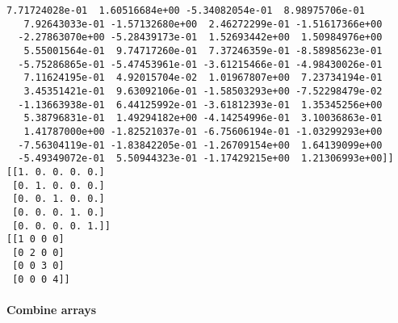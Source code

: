 \documentclass[11pt]{article}
\begin{document}
\begin{Verbatim}[commandchars=\\\{\}]
   7.71724028e-01  1.60516684e+00 -5.34082054e-01  8.98975706e-01
   7.92643033e-01 -1.57132680e+00  2.46272299e-01 -1.51617366e+00
  -2.27863070e+00 -5.28439173e-01  1.52693442e+00  1.50984976e+00
   5.55001564e-01  9.74717260e-01  7.37246359e-01 -8.58985623e-01
  -5.75286865e-01 -5.47453961e-01 -3.61215466e-01 -4.98430026e-01
   7.11624195e-01  4.92015704e-02  1.01967807e+00  7.23734194e-01
   3.45351421e-01  9.63092106e-01 -1.58503293e+00 -7.52298479e-02
  -1.13663938e-01  6.44125992e-01 -3.61812393e-01  1.35345256e+00
   5.38796831e-01  1.49294182e+00 -4.14254996e-01  3.10036863e-01
   1.41787000e+00 -1.82521037e-01 -6.75606194e-01 -1.03299293e+00
  -7.56304119e-01 -1.83842205e-01 -1.26709154e+00  1.64139099e+00
  -5.49349072e-01  5.50944323e-01 -1.17429215e+00  1.21306993e+00]]
[[1. 0. 0. 0. 0.]
 [0. 1. 0. 0. 0.]
 [0. 0. 1. 0. 0.]
 [0. 0. 0. 1. 0.]
 [0. 0. 0. 0. 1.]]
[[1 0 0 0]
 [0 2 0 0]
 [0 0 3 0]
 [0 0 0 4]]

    \end{Verbatim}

    \paragraph{Combine arrays}\label{combine-arrays}
\end{document}
